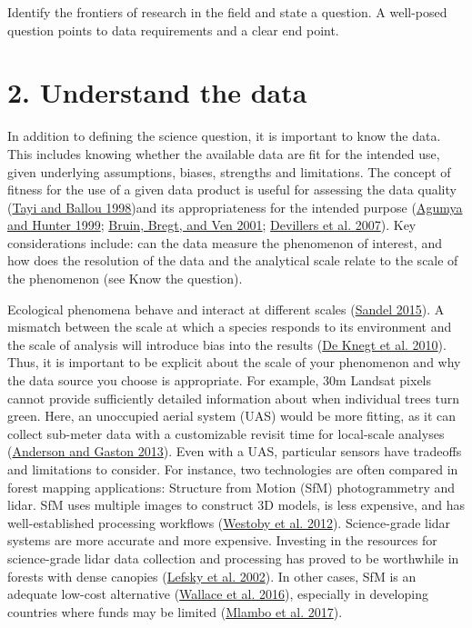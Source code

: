 \documentclass[
  12pt,
]{article}
\begin{document}
Identify the frontiers of research in the field and state a question. A
well-posed question points to data requirements and a clear end point.

\hypertarget{understand-the-data}{%
\section{2. Understand the data}\label{understand-the-data}}

In addition to defining the science question, it is important to know
the data. This includes knowing whether the available data are fit for
the intended use, given underlying assumptions, biases, strengths and
limitations. The concept of fitness for the use of a given data product
is useful for assessing the data quality
(\protect\hyperlink{ref-tayi1998examining}{Tayi and Ballou 1998})and its
appropriateness for the intended purpose
(\protect\hyperlink{ref-agumya1999risk}{Agumya and Hunter 1999};
\protect\hyperlink{ref-bruin2001assessing}{Bruin, Bregt, and Ven 2001};
\protect\hyperlink{ref-devillers2007towards}{Devillers et al. 2007}).
Key considerations include: can the data measure the phenomenon of
interest, and how does the resolution of the data and the analytical
scale relate to the scale of the phenomenon (see Know the question).

Ecological phenomena behave and interact at different scales
(\protect\hyperlink{ref-sandel2015}{Sandel 2015}). A mismatch between
the scale at which a species responds to its environment and the scale
of analysis will introduce bias into the results
(\protect\hyperlink{ref-de2010spatial}{De Knegt et al. 2010}). Thus, it
is important to be explicit about the scale of your phenomenon and why
the data source you choose is appropriate. For example, 30m Landsat
pixels cannot provide sufficiently detailed information about when
individual trees turn green. Here, an unoccupied aerial system (UAS)
would be more fitting, as it can collect sub-meter data with a
customizable revisit time for local-scale analyses
(\protect\hyperlink{ref-anderson2013lightweight}{Anderson and Gaston
2013}). Even with a UAS, particular sensors have tradeoffs and
limitations to consider. For instance, two technologies are often
compared in forest mapping applications: Structure from Motion (SfM)
photogrammetry and lidar. SfM uses multiple images to construct 3D
models, is less expensive, and has well-established processing workflows
(\protect\hyperlink{ref-westoby2012structure}{Westoby et al. 2012}).
Science-grade lidar systems are more accurate and more expensive.
Investing in the resources for science-grade lidar data collection and
processing has proved to be worthwhile in forests with dense canopies
(\protect\hyperlink{ref-lefsky2002lidar}{Lefsky et al. 2002}). In other
cases, SfM is an adequate low-cost alternative
(\protect\hyperlink{ref-wallace2016assessment}{Wallace et al. 2016}),
especially in developing countries where funds may be limited
(\protect\hyperlink{ref-mlambo2017structure}{Mlambo et al. 2017}).
\end{document}
